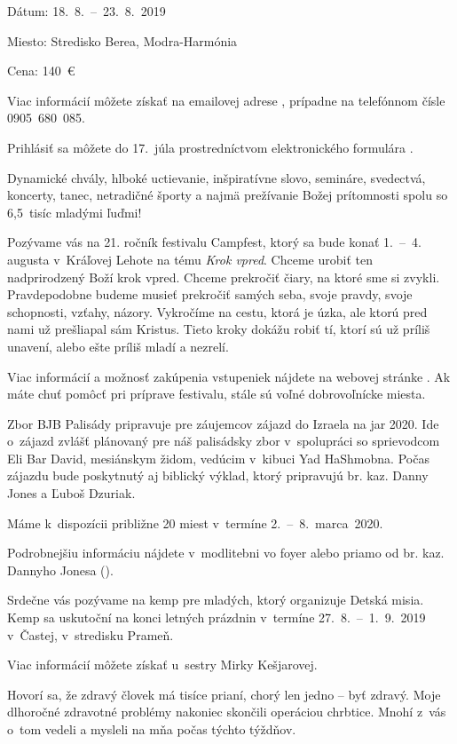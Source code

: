 Dátum: 18.~8.~--~23.~8.~2019

Miesto: Stredisko Berea, Modra-Harmónia

Cena: 140~€

Viac informácií môžete získať na emailovej adrese , prípadne na telefónnom čísle 0905~680~085.

Prihlásiť sa môžete do 17.~júla prostredníctvom elektronického formulára .


Dynamické chvály, hlboké uctievanie, inšpiratívne slovo, semináre, svedectvá, koncerty, tanec, netradičné športy a najmä prežívanie Božej prítomnosti spolu so 6,5~tisíc mladými ľuďmi!

Pozývame vás na 21. ročník festivalu Campfest, ktorý sa bude konať 1.~--~4. augusta v~Kráľovej Lehote na tému {\it Krok vpred}. Chceme urobiť ten nadprirodzený Boží krok vpred. Chceme prekročiť čiary, na ktoré sme si zvykli. Pravdepodobne budeme musieť prekročiť samých seba, svoje pravdy, svoje schopnosti, vzťahy, názory. Vykročíme na cestu, ktorá je úzka, ale ktorú pred nami už prešliapal sám Kristus. Tieto kroky dokážu robiť tí, ktorí sú už príliš unavení, alebo ešte príliš mladí a nezrelí.

Viac informácií a možnosť zakúpenia vstupeniek nájdete na webovej stránke . Ak máte chuť pomôcť pri príprave festivalu, stále sú voľné dobrovoľnícke miesta.


Zbor BJB Palisády pripravuje pre záujemcov zájazd do Izraela na jar 2020. Ide o~zájazd zvlášť plánovaný pre náš palisádsky zbor v~spolupráci so sprievodcom Eli Bar David, mesiánskym židom, vedúcim v~kibuci Yad HaShmobna. Počas zájazdu bude poskytnutý aj biblický výklad, ktorý pripravujú br. kaz. Danny Jones a Ľuboš Dzuriak.

Máme k~dispozícii približne 20 miest v~termíne 2.~--~8.~marca~2020.

Podrobnejšiu informáciu nájdete v~modlitebni vo foyer alebo priamo od br. kaz. Dannyho Jonesa ().


Srdečne vás pozývame na kemp pre mladých, ktorý organizuje Detská misia. Kemp sa uskutoční na konci letných prázdnin v~termíne 27.~8.~--~1.~9.~2019 v~Častej, v~stredisku Prameň.

Viac informácií môžete získať u~sestry Mirky Kešjarovej.


Hovorí sa, že zdravý človek má tisíce prianí, chorý len jedno -- byť zdravý. Moje  dlhoročné zdravotné problémy nakoniec skončili operáciou chrbtice. Mnohí z~vás o~tom vedeli a mysleli na mňa počas týchto týždňov.

